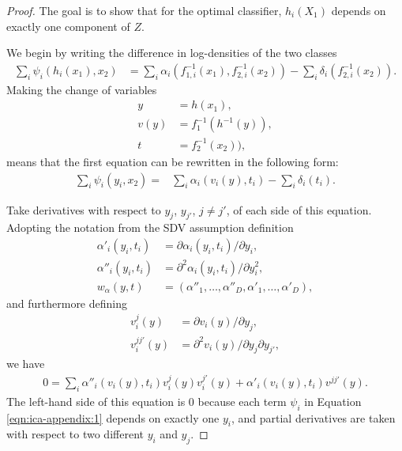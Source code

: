 \begin{proof}

The goal is to show that for the optimal classifier, $h_i(X_1)$ depends on exactly one component of $Z$. 

	
We begin by writing the difference in log-densities of the two classes
	\begin{align*}
	\sum_{i}\psi_{i}(h_{i}(x_{1}),x_{2})  &=\sum_{i}\alpha_{i}({f}_{1,i}^{-1}({x}_{1}), {f}_{2,i}^{-1}({x}_{2})) -\sum_{i}\delta_{i}( {f}_{2,i}^{-1}({x}_{2})).
	\end{align*}
Making the change of variables
	\begin{align*}
	{y} & ={h}({x}_{1}),\\
	{v}({y}) & ={f}_{1}^{-1}({h}^{-1}({y})),\\
	{t} & = {f}_{2}^{-1}({x}_{2})),
	\end{align*}
means that the first equation can be rewritten in the following form:
	\begin{align}
	\sum_{i}\psi_{i}(y_{i},{x}_{2})=&\sum_{i}\alpha_{i}(v_{i}({y}), t_{i}) -\sum_{i}\delta_{i}( t_{i}). \label{eqn:ica-appendix:1}
	\end{align}
	
Take derivatives with respect to $y_j$, $y_{j'}$, $j \neq j'$,  of each side of this equation. 
Adopting the notation from the SDV assumption definition
	\begin{align*}
	\alpha'_{i}(y_i, t_i)&= \partial \alpha_{i}(y_i, t_i)/\partial y_i,\\
	\alpha''_{i}(y_i, t_i)&=\partial^2 \alpha_{i}(y_i, t_i)/\partial y_i^2, \\
	{w}_{\alpha}({y}, {t}) &= (\alpha''_{1}, \ldots, \alpha''_{D}, \alpha'_{1}, \ldots,\alpha'_{D}),
	\end{align*}
 and furthermore defining 
	\begin{align*}
	v^j_i({y})&=\partial v_i({y})/\partial y_j,\\
	v^{jj'}_i({y})&= \partial^2 v_i({y})/\partial y_j \partial y_{j'},
	\end{align*}
	we have
	\begin{align*}
	0 = \sum_{i} \alpha''_{i}(v_{i}({y}), t_{i})v^j_i({y})v^{j'}_i({y}) + \alpha'_{i}(v_{i}({y}),  t_{i})v^{jj'}({y}).
	\end{align*}
	The left-hand side of this equation is $0$ because each term $\psi_i$ in Equation \ref{eqn:ica-appendix:1} depends on exactly one $y_i$, and partial derivatives are taken with respect to two different $y_i$ and $y_j$.


\end{proof}
